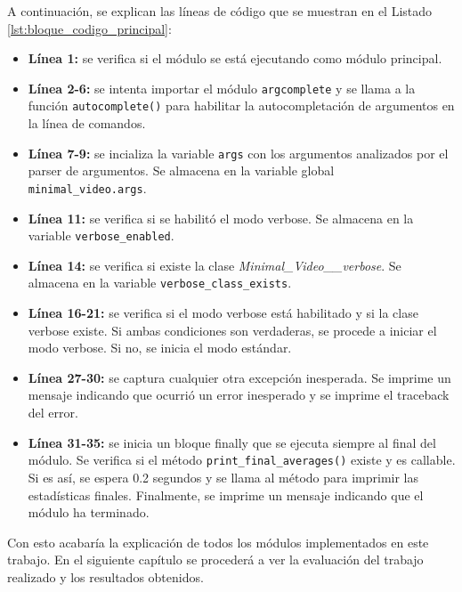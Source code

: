 A continuación, se explican las líneas de código que se muestran en el Listado \ref{lst:bloque_codigo_principal}:
\begin{itemize}
    \item \textbf{Línea 1:} se verifica si el módulo se está ejecutando como módulo principal.
    \item \textbf{Línea 2-6:} se intenta importar el módulo \texttt{argcomplete} y se llama a la función \texttt{autocomplete()} para habilitar la autocompletación de argumentos en la línea de comandos.
    \item \textbf{Línea 7-9:} se incializa la variable \texttt{args} con los argumentos analizados por el parser de argumentos. Se almacena en la variable global \texttt{minimal\_video.args}.
    \item \textbf{Línea 11:} se verifica si se habilitó el modo verbose. Se almacena en la variable \texttt{verbose\_enabled}.
    \item \textbf{Línea 14:} se verifica si existe la clase \textit{Minimal\_Video\_\_verbose}. Se almacena en la variable \texttt{verbose\_class\_exists}.
    \item \textbf{Línea 16-21:} se verifica si el modo verbose está habilitado y si la clase verbose existe. Si ambas condiciones son verdaderas, se procede a iniciar el modo verbose. Si no, se inicia el modo estándar.
    \item \textbf{Línea 27-30:} se captura cualquier otra excepción inesperada. Se imprime un mensaje indicando que ocurrió un error inesperado y se imprime el traceback del error.
    \item \textbf{Línea 31-35:} se inicia un bloque finally que se ejecuta siempre al final del módulo. Se verifica si el método \texttt{print\_final\_averages()} existe y es callable. Si es así, se espera 0.2 segundos y se llama al método para imprimir las estadísticas finales. Finalmente, se imprime un mensaje indicando que el módulo ha terminado.
\end{itemize}
\vspace{\baselineskip}

Con esto acabaría la explicación de todos los módulos implementados en este trabajo. En el siguiente capítulo se procederá a ver la evaluación del trabajo realizado y los resultados obtenidos.